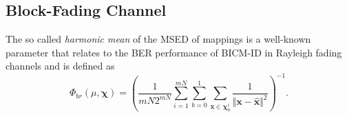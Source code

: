 \documentclass[12pt, draftclsnofoot, onecolumn]{IEEEtran}
\newcommand{\mb}[1]{\boldsymbol{#1}}
\begin{document}


\subsection{  Block-Fading \color{black} Channel}

 The so called \emph{harmonic mean}  of the MSED \cite{BICM} of mappings is a well-known parameter that relates  to the BER  performance of  BICM-ID in Rayleigh fading channels  and is defined as \cite{BICM} \color{black}
\begin{equation}
\Phi_{br}(\mu, \mb{\chi}) = \left(\dfrac{1}{mN2^{mN}}\sum_{i=1}^{mN} \sum_{b=0}^{1} \sum_{{\mb x}\in \mb{\chi}_{b}^{i}} \dfrac{1}{\Vert {\mb x}- \hat{\mb x} \Vert^{2}}\right) ^{-1}.
\label{Harmonic_fading}
\end{equation} 
\end{document}
